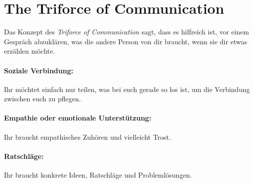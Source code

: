 \section{The Triforce of Communication}
\label{triforce-communication}

Das Konzept des \emph{Triforce of Communication}\cite{triforce-of-communication} sagt, dass es hilfreich ist, vor einem Gespräch abzuklären, was die andere Person von dir braucht, wenn sie dir etwas erzählen möchte.

\paragraph{ Soziale Verbindung:} Ihr möchtet einfach nur teilen, was bei euch gerade so los ist, um die Verbindung zwischen euch zu pflegen.

\paragraph{ Empathie oder emotionale Unterstützung:} Ihr braucht empathisches Zuhören und vielleicht Trost.

\paragraph{ Ratschläge:} Ihr braucht konkrete Ideen, Ratschläge und Problemlösungen.
